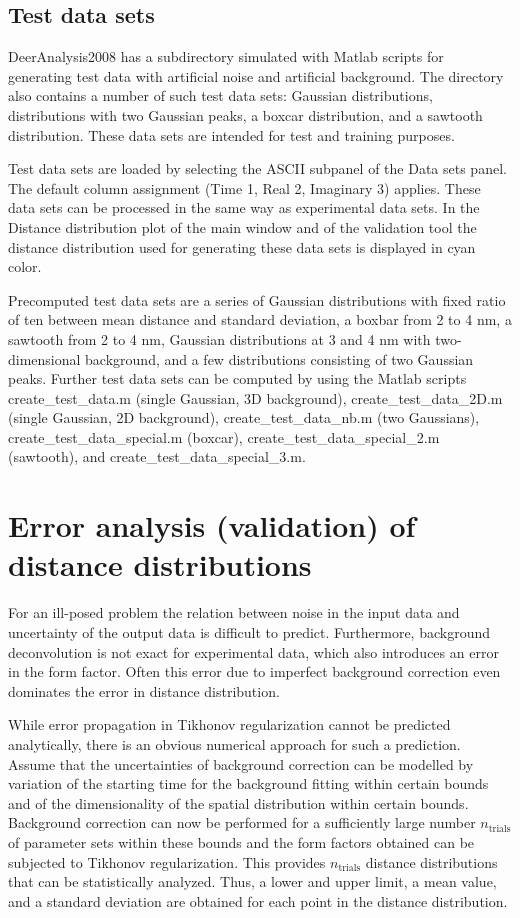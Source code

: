 \documentclass{article}
\begin{document}
\subsection{Test data sets}
DeerAnalysis2008 has a subdirectory {\ttfamily simulated} with Matlab scripts for generating test data with artificial noise and artificial background. The directory also contains a number of such test data sets: Gaussian distributions, distributions with two Gaussian peaks, a boxcar distribution, and a sawtooth distribution. These data sets are intended for test and training purposes.

Test data sets are loaded by selecting the {\ttfamily ASCII} subpanel of the {\ttfamily Data sets} panel. The default column assignment (Time 1, Real 2, Imaginary 3) applies. These data sets can be processed in the same way as experimental data sets. In the {\ttfamily Distance distribution} plot of the main window and of the validation tool the distance distribution used for generating these data sets is displayed in cyan color.

Precomputed test data sets are a series of Gaussian distributions with fixed ratio of ten between mean distance and standard deviation, a boxbar from 2 to 4 nm, a sawtooth from 2 to 4 nm, Gaussian distributions at 3 and 4 nm with two-dimensional background, and a few distributions consisting of two Gaussian peaks. Further test data sets can be computed by using the Matlab scripts {\ttfamily create\_test\_data.m} (single Gaussian, 3D background), {\ttfamily create\_test\_data\_2D.m} (single Gaussian, 2D background), {\ttfamily create\_test\_data\_nb.m} (two Gaussians), {\ttfamily create\_test\_data\_special.m} (boxcar), {\ttfamily create\_test\_data\_special\_2.m} (sawtooth), and {\ttfamily create\_test\_data\_special\_3.m}.

\section{Error analysis (validation) of distance distributions}
\label{validation}
For an ill-posed problem the relation between noise in the input data and uncertainty of the output data is difficult to predict. Furthermore, background deconvolution is not exact for experimental data, which also introduces an error in the form factor. Often this error due to imperfect background correction even dominates the error in distance distribution.

While error propagation in Tikhonov regularization cannot be predicted analytically, there is an obvious numerical approach for such a prediction. Assume that the uncertainties of background correction can be modelled by variation of the starting time for the background fitting within certain bounds and of the dimensionality of the spatial distribution within certain bounds. Background correction can now be performed for a sufficiently large number $n_\mathrm{trials}$ of parameter sets within these bounds and the form factors obtained can be subjected to Tikhonov regularization. This provides $n_\mathrm{trials}$ distance distributions that can be statistically analyzed. Thus, a lower and upper limit, a mean value, and a standard deviation are obtained for each point in the distance distribution.
\end{document}
